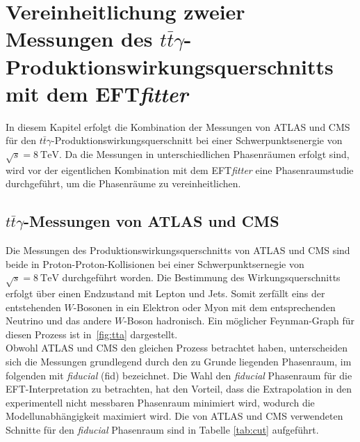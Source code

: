 \chapter{Vereinheitlichung zweier Messungen des \protect\boldmath\texorpdfstring {$t\bar{t}\gamma$}{math}-Produktionswirkungsquerschnitts mit dem EFT\textit{fitter}}%
In diesem Kapitel erfolgt die Kombination der Messungen von ATLAS und CMS für den $t\bar{t}\gamma$-Produktionswirkungsquerschnitt bei einer Schwerpunktsenergie von $\sqrt{s} = \SI{8}{\tera\electronvolt}$. Da die Messungen in unterschiedlichen Phasenräumen erfolgt sind, wird vor der eigentlichen Kombination mit dem EFT\textit{fitter} eine Phasenraumstudie durchgeführt, um die Phasenräume zu vereinheitlichen.

\section{\texorpdfstring {$t\bar{t}\gamma$}{math}-Messungen von ATLAS und CMS}%
\label{kap:messung}
Die Messungen des Produktionswirkungsquerschnitts von ATLAS und CMS sind beide in Proton-Proton-Kollisionen bei einer Schwerpunktsernegie von $\sqrt{s}=\SI{8}{\tera\electronvolt}$ durchgeführt worden. Die Bestimmung des Wirkungsquerschnitts erfolgt über einen Endzustand mit Lepton und Jets. Somit zerfällt eins der entstehenden $W$-Bosonen in ein Elektron oder Myon mit dem entsprechenden Neutrino und das andere $W$-Boson hadronisch. Ein möglicher Feynman-Graph für diesen Prozess ist in~\ref{fig:tta} dargestellt.\\
Obwohl ATLAS und CMS den gleichen Prozess betrachtet haben, unterscheiden sich die Messungen grundlegend durch den zu Grunde liegenden Phasenraum, im folgenden mit \textit{fiducial} (fid) bezeichnet. Die Wahl den \textit{fiducial} Phasenraum für die EFT-Interpretation zu betrachten, hat den Vorteil, dass die Extrapolation in den experimentell nicht messbaren Phasenraum minimiert wird, wodurch die Modellunabhängigkeit maximiert wird. Die von ATLAS und CMS verwendeten Schnitte für den \textit{fiducial} Phasenraum sind in Tabelle \ref{tab:cut}
aufgeführt.\\
%

